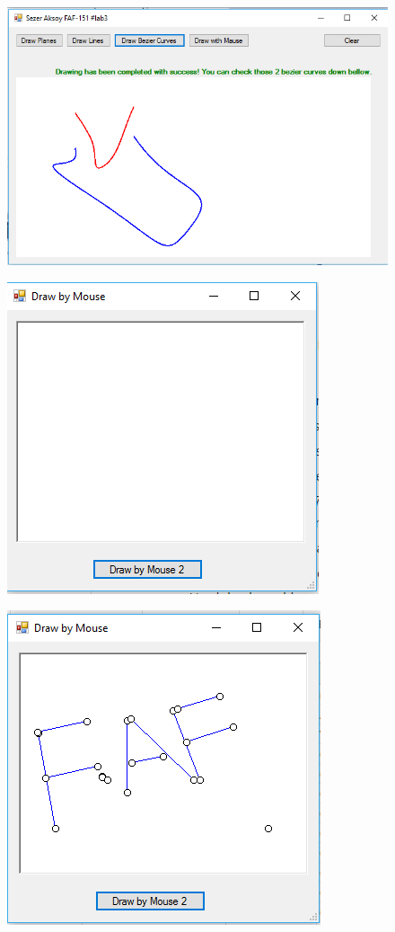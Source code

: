 \begin{figure}
	\centering
	\includegraphics[width=0.7\linewidth]{../../LAB3/img/4}
	\caption{}
	\label{fig:4}
\end{figure}


\begin{figure}
	\centering
	\includegraphics[width=0.7\linewidth]{../../LAB3/img/5}
	\caption{}
	\label{fig:5}
\end{figure}


\begin{figure}
	\centering
	\includegraphics[width=0.7\linewidth]{../../LAB3/img/6}
	\caption{}
	\label{fig:6}
\end{figure}


